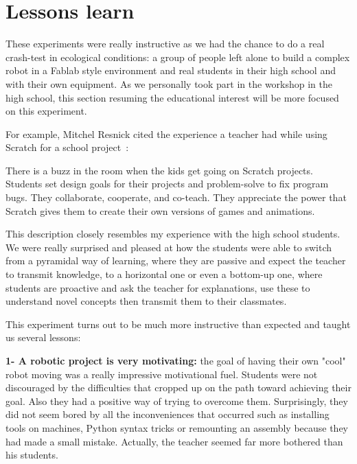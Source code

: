 
\section{Lessons learn} %
\label{sec:education-lessons}

These experiments were really instructive as we had the chance to do a real crash-test in ecological conditions: a group of people left alone to build a complex robot in a Fablab style environment and real students in their high school and with their own equipment. As we personally took part in the workshop in the high school, this section resuming the educational interest will be more focused on this experiment.

For example, Mitchel Resnick cited the experience a teacher had while using Scratch for a school project~\parencite{resnick2008sowing}:
\begin{formal}
    There is a buzz in the room when the kids get going on Scratch projects. Students set design goals for their projects and problem-solve to fix program bugs. They collaborate, cooperate, and co-teach. They appreciate the power that Scratch gives them to create their own versions of games and animations.

\end{formal}

This description closely resembles my experience with the high school students. We were really surprised and pleased at how the students were able to switch from a pyramidal way of learning, where they are passive and expect the teacher to transmit knowledge, to a horizontal one or even a bottom-up one, where students are proactive and ask the teacher for explanations, use these to understand novel concepts then transmit them to their classmates.

This experiment turns out to be much more instructive than expected and taught us several lessons:

\textbf{1- A robotic project is very motivating:} the goal of having their own "cool" robot moving was a really impressive motivational fuel. Students were not discouraged by the difficulties that cropped up on the path toward achieving their goal. Also they had a positive way of trying to overcome them. Surprisingly, they did not seem bored by all the inconveniences that occurred such as installing tools on machines, Python syntax tricks or remounting an assembly because they had made a small mistake. Actually, the teacher seemed far more bothered than his students.

